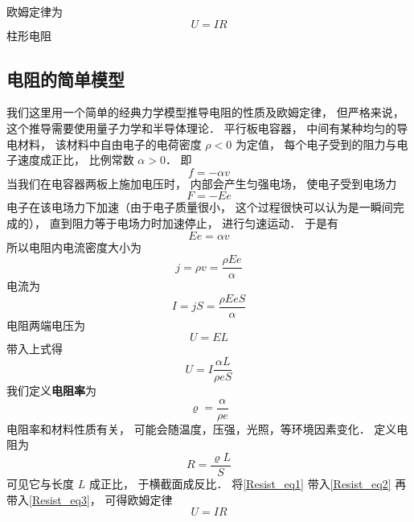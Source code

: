

欧姆定律为
\begin{equation}
U = IR
\end{equation}
柱形电阻


\subsection{电阻的简单模型}
我们这里用一个简单的经典力学模型推导电阻的性质及欧姆定律， 但严格来说， 这个推导需要使用量子力学和半导体理论． 平行板电容器， 中间有某种均匀的导电材料， 该材料中自由电子的电荷密度 $\rho < 0$ 为定值， 每个电子受到的阻力与电子速度成正比， 比例常数 $\alpha > 0$． 即
\begin{equation}
f = -\alpha v
\end{equation}
当我们在电容器两板上施加电压时， 内部会产生匀强电场， 使电子受到电场力
\begin{equation}
F = -Ee
\end{equation}
电子在该电场力下加速（由于电子质量很小， 这个过程很快可以认为是一瞬间完成的）， 直到阻力等于电场力时加速停止， 进行匀速运动． 于是有
\begin{equation}
Ee = \alpha v
\end{equation}
所以电阻内电流密度大小为
\begin{equation}
j = \rho v = \frac{\rho Ee}{\alpha}
\end{equation}
电流为
\begin{equation}
I = jS = \frac{\rho EeS}{\alpha}
\end{equation}
电阻两端电压为
\begin{equation}
U = EL
\end{equation}
带入上式得
\begin{equation}\label{Resist_eq3}
U = I \frac{\alpha L}{\rho eS}
\end{equation}
我们定义\textbf{电阻率}为
\begin{equation}\label{Resist_eq1}
\varrho = \frac{\alpha}{\rho e}
\end{equation}
电阻率和材料性质有关， 可能会随温度，压强，光照，等环境因素变化． 定义电阻为
\begin{equation}\label{Resist_eq2}
R = \frac{\varrho L}{S}
\end{equation}
可见它与长度 $L$ 成正比， 于横截面成反比． 将\autoref{Resist_eq1} 带入\autoref{Resist_eq2} 再带入\autoref{Resist_eq3}， 可得欧姆定律
\begin{equation}
U = IR
\end{equation}
